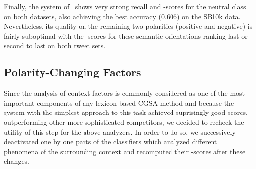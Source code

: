 Finally, the system of~\citet{Kolchyna:15} shows very strong recall
and \F{}-scores for the neutral class on both datasets, also achieving
the best accuracy (0.606) on the SB10k data.  Nevertheless, its
quality on the remaining two polarities (positive and negative) is
fairly suboptimal with the \F{}-scores for these semantic orientations
ranking last or second to last on both tweet sets.

\subsection{Polarity-Changing Factors}\label{subsec:cgsa:lex-methods:pol-change}

Since the analysis of context factors is commonly considered as one of
the most important components of any lexicon-based CGSA method and
because the system with the simplest approach to this task achieved
suprisingly good scores, outperforming other more sophisticated
competitors, we decided to recheck the utility of this step for the
above analyzers.  In order to do so, we successively deactivated one
by one parts of the classifiers which analyzed different phenomena of
the surrounding context and recomputed their \F{}-scores after these
changes.

